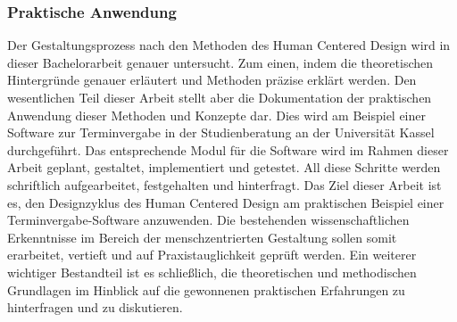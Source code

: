 \subsubsection{Praktische Anwendung}
Der Gestaltungsprozess nach den Methoden des Human Centered Design wird in
dieser Bachelorarbeit genauer untersucht. Zum einen, indem die
theoretischen Hintergründe genauer erläutert und Methoden präzise erklärt
werden. Den wesentlichen Teil dieser Arbeit stellt aber die Dokumentation der
praktischen Anwendung dieser Methoden und Konzepte dar. Dies wird am
Beispiel einer Software zur Terminvergabe in der Studienberatung an der
Universität Kassel durchgeführt. Das entsprechende Modul für die
Software wird im Rahmen dieser Arbeit geplant, gestaltet, implementiert und
getestet. All diese Schritte werden schriftlich aufgearbeitet,
festgehalten und hinterfragt. Das Ziel dieser Arbeit ist es, den
Designzyklus des Human Centered Design am praktischen Beispiel einer
Terminvergabe-Software anzuwenden. Die bestehenden wissenschaftlichen
Erkenntnisse im Bereich der menschzentrierten Gestaltung sollen somit
erarbeitet, vertieft und auf Praxistauglichkeit geprüft werden. Ein weiterer
wichtiger Bestandteil ist es schließlich, die theoretischen und methodischen
Grundlagen im Hinblick auf die gewonnenen praktischen Erfahrungen zu
hinterfragen und zu diskutieren.

